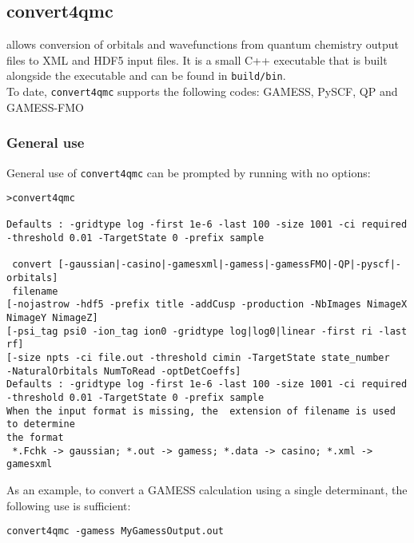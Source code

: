 \subsection{convert4qmc}
\label{sec:convert4qmc}
 allows conversion of orbitals and wavefunctions from
quantum chemistry output files to \qmcpack XML and HDF5 input files.
It is a small C++ executable that is built alongside the \qmcpack
executable and can be found in \texttt{build/bin}.\\

To date, \texttt{convert4qmc} supports the following codes:
GAMESS\cite{schmidt93}, PySCF\cite{Sun2018}, QP\cite{QP}
and GAMESS-FMO\cite{Fedorov2004,schmidt93}

\subsubsection{General use}
General use of \texttt{convert4qmc} can be prompted by running with no options:

\begin{lstlisting}[style=SHELL]
>convert4qmc

Defaults : -gridtype log -first 1e-6 -last 100 -size 1001 -ci required -threshold 0.01 -TargetState 0 -prefix sample

 convert [-gaussian|-casino|-gamesxml|-gamess|-gamessFMO|-QP|-pyscf|-orbitals] 
 filename                                                          
[-nojastrow -hdf5 -prefix title -addCusp -production -NbImages NimageX NimageY NimageZ]
[-psi_tag psi0 -ion_tag ion0 -gridtype log|log0|linear -first ri -last rf]
[-size npts -ci file.out -threshold cimin -TargetState state_number
-NaturalOrbitals NumToRead -optDetCoeffs]                                        
Defaults : -gridtype log -first 1e-6 -last 100 -size 1001 -ci required 
-threshold 0.01 -TargetState 0 -prefix sample                                
When the input format is missing, the  extension of filename is used to determine
the format                                                      
 *.Fchk -> gaussian; *.out -> gamess; *.data -> casino; *.xml -> gamesxml
\end{lstlisting}

As an example, to convert a GAMESS calculation using a single determinant, the following use is sufficient:\\
\begin{lstlisting}[style=SHELL]
convert4qmc -gamess MyGamessOutput.out
\end{lstlisting}

